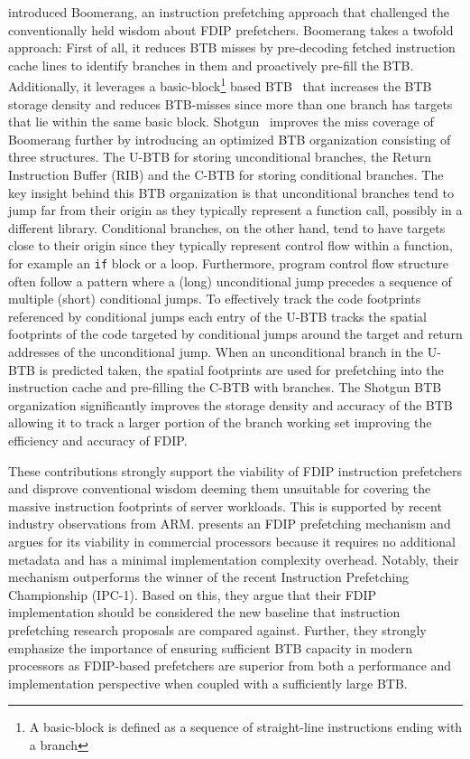 \documentclass[../main.tex]{subfiles}
\begin{document}
\begin{refsection}
\textcite{kumar17_boomer} introduced Boomerang, an instruction
prefetching approach that challenged the conventionally held wisdom
about FDIP prefetchers. Boomerang takes a twofold approach: First of
all, it reduces BTB misses by pre-decoding fetched instruction cache
lines to identify branches in them and proactively pre-fill the
BTB. Additionally, it leverages a basic-block\footnote{A basic-block
  is defined as a sequence of straight-line instructions ending with a
  branch} based BTB~\cite{yeh92_compr_instr_fetch_mechan_for} that
increases the BTB storage density and reduces BTB-misses since more
than one branch has targets that lie within the same basic
block. Shotgun~\cite{kumar18_blast_throug_front_end_bottl_with_shotg,kumar20_shoot_down_server_front_end_bottl}
improves the miss coverage of Boomerang further by introducing an
optimized BTB organization consisting of three structures. The U-BTB
for storing unconditional branches, the Return Instruction Buffer
(RIB) and the C-BTB for storing conditional branches. The key insight
behind this BTB organization is that unconditional branches tend to
jump far from their origin as they typically represent a function
call, possibly in a different library. Conditional branches, on the
other hand, tend to have targets close to their origin since they
typically represent control flow within a function, for example an
\texttt{if} block or a loop. Furthermore, program control flow
structure often follow a pattern where a (long) unconditional jump
precedes a sequence of multiple (short) conditional jumps. To
effectively track the code footprints referenced by conditional jumps
each entry of the U-BTB tracks the spatial footprints of the code
targeted by conditional jumps around the target and return addresses
of the unconditional jump. When an unconditional branch in the U-BTB
is predicted taken, the spatial footprints are used for prefetching
into the instruction cache and pre-filling the C-BTB with
branches. The Shotgun BTB organization significantly improves the
storage density and accuracy of the BTB allowing it to track a larger
portion of the branch working set improving the efficiency and
accuracy of FDIP.

These contributions strongly support the viability of FDIP instruction
prefetchers and disprove conventional wisdom deeming them unsuitable
for covering the massive instruction footprints of server
workloads. This is supported by recent industry observations from
ARM. \textcite{ishii21_re_fetch_direc_instr_prefet} presents an FDIP
prefetching mechanism and argues for its viability in commercial
processors because it requires no additional metadata and has a
minimal implementation complexity overhead. Notably, their mechanism
outperforms the winner of the recent Instruction Prefetching
Championship (IPC-1). Based on this, they argue that their FDIP
implementation should be considered the new baseline that instruction
prefetching research proposals are compared against. Further, they
strongly emphasize the importance of ensuring sufficient BTB capacity
in modern processors as FDIP-based prefetchers are superior from both
a performance and implementation perspective when coupled with a
sufficiently large BTB.





\end{refsection}
\end{document}
